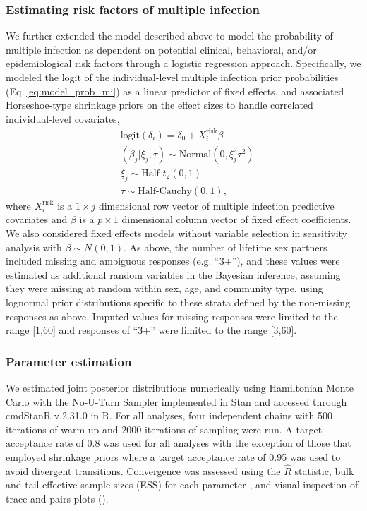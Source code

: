 \documentclass[10pt,letterpaper]{article}
\begin{document}
\subsubsection{Estimating risk factors of multiple infection}
\label{sec:extended_model}
We further extended the model described above to model the probability of multiple infection as dependent on potential clinical, behavioral, and/or epidemiological risk factors through a logistic regression approach. Specifically, we modeled the logit of the individual-level multiple infection prior probabilities (Eq~\ref{eq:model_prob_mi}) as a linear predictor of fixed effects, and associated Horseshoe-type shrinkage priors\cite{carvalho2009, piironen2017} on the effect sizes to handle correlated individual-level covariates, 
\begin{subequations}
\label{eq:delta_i_covariates}
\begin{align}
&\text{logit}\left(\delta_i\right) = \delta_0 +  X^{\text{risk}}_i \beta\\
&(\beta_j | \xi_j,\tau) \sim \text{Normal}(0,\xi_j^2\tau^2)\\
&\xi_j \sim  \text{Half-}t_2(0, 1)\\
&\tau \sim \text{Half-Cauchy}(0,1),
\end{align}
\end{subequations}
where $X^{\text{risk}}_i$ is a $1 \times j$ dimensional row vector of multiple infection predictive covariates and $\beta$ is a $p \times 1$ dimensional column vector of fixed effect coefficients. We also considered fixed effects models without variable selection in sensitivity analysis with $\beta \sim N(0,1)$.
%
As above, the number of lifetime sex partners included missing and ambiguous responses (e.g. ``3+''), and these values were estimated as additional random variables in the Bayesian inference, assuming they were missing at random within sex, age, and community type, using lognormal prior distributions specific to these strata defined by the non-missing responses as above. Imputed values for missing responses were limited to the range [1,60] and responses of ``3+'' were limited to the range [3,60].  
\par

\subsubsection{Parameter estimation}
We estimated joint posterior distributions numerically using Hamiltonian Monte Carlo \cite{betancourt2013} with the No-U-Turn Sampler \cite{hoffman2014} implemented in Stan \cite{stan2024} and accessed through cmdStanR v.2.31.0 \cite{gabry2023} in R. For all analyses, four independent chains with 500 iterations of warm up and 2000 iterations of sampling were run. A target acceptance rate of 0.8 was used for all analyses with the exception of those that employed shrinkage priors where a target acceptance rate of 0.95 was used to avoid divergent transitions. Convergence was assessed using the $\hat{R}$ statistic, bulk and tail effective sample sizes (ESS) for each parameter \cite{vehtari2021}, and visual inspection of trace and pairs plots (). \par
\end{document}
